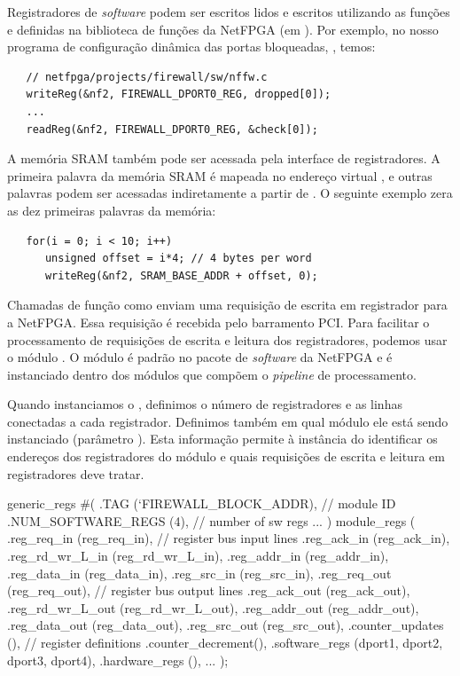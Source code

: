 Registradores de \emph{software} podem ser escritos lidos e escritos
utilizando as funções  e  definidas na
biblioteca de funções da NetFPGA (em ).  Por
exemplo, no nosso programa de configuração dinâmica das portas
bloqueadas, , temos:

\begin{verbatim}
   // netfpga/projects/firewall/sw/nffw.c
   writeReg(&nf2, FIREWALL_DPORT0_REG, dropped[0]);
   ...
   readReg(&nf2, FIREWALL_DPORT0_REG, &check[0]);
\end{verbatim}

A memória SRAM também pode ser acessada pela interface de
registradores.  A primeira palavra da memória SRAM é mapeada no
endereço virtual , e outras palavras podem ser
acessadas indiretamente a partir de .  O
seguinte exemplo zera as dez primeiras palavras da memória:

\begin{verbatim}
   for(i = 0; i < 10; i++)
      unsigned offset = i*4; // 4 bytes per word
      writeReg(&nf2, SRAM_BASE_ADDR + offset, 0);
\end{verbatim}

Chamadas de função como  enviam uma requisição de
escrita em registrador para a NetFPGA.  Essa requisição é recebida
pelo barramento PCI.  Para facilitar o processamento de requisições
de escrita e leitura dos registradores, podemos usar o módulo
.  O módulo  é padrão no
pacote de \emph{software} da NetFPGA e é instanciado dentro dos
módulos que compõem o \emph{pipeline} de processamento.

Quando instanciamos o , definimos o número de
registradores e as linhas conectadas a cada registrador.  Definimos
também em qual módulo ele está sendo instanciado (parâmetro
).  Esta informação permite à instância do
 identificar os endereços dos registradores do
módulo e quais requisições de escrita e leitura em registradores
deve tratar.

\begin{verilogcode}
   generic_regs
   #(
      .TAG               (`FIREWALL_BLOCK_ADDR), // module ID
      .NUM_SOFTWARE_REGS (4),                    // number of sw regs
      ...
   ) module_regs (
      .reg_req_in       (reg_req_in),      // register bus input lines
      .reg_ack_in       (reg_ack_in),
      .reg_rd_wr_L_in   (reg_rd_wr_L_in),
      .reg_addr_in      (reg_addr_in),
      .reg_data_in      (reg_data_in),
      .reg_src_in       (reg_src_in),
      .reg_req_out      (reg_req_out),     // register bus output lines
      .reg_ack_out      (reg_ack_out),
      .reg_rd_wr_L_out  (reg_rd_wr_L_out),
      .reg_addr_out     (reg_addr_out),
      .reg_data_out     (reg_data_out),
      .reg_src_out      (reg_src_out),
      .counter_updates  (),                // register definitions
      .counter_decrement(),
      .software_regs    ({dport1, dport2, dport3, dport4}),
      .hardware_regs    (),
      ...
    );
\end{verilogcode}

